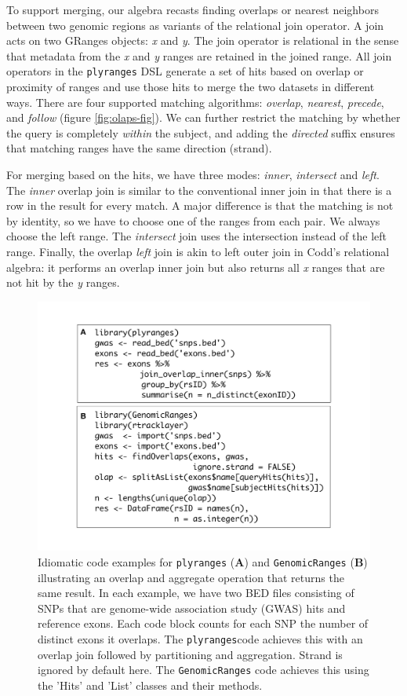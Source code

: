 \documentclass[]{article}
\begin{document}
To support merging, our algebra recasts finding overlaps or nearest
neighbors between two genomic regions as variants of the relational join
operator. A join acts on two GRanges objects: \emph{x} and \emph{y}. The
join operator is relational in the sense that metadata from the \emph{x}
and \emph{y} ranges are retained in the joined range. All join operators
in the \texttt{plyranges} DSL generate a set of hits based on overlap or
proximity of ranges and use those hits to merge the two datasets in
different ways. There are four supported matching algorithms:
\emph{overlap}, \emph{nearest}, \emph{precede}, and \emph{follow}
(figure \ref{fig:olaps-fig}). We can further restrict the matching by
whether the query is completely \emph{within} the subject, and adding
the \emph{directed} suffix ensures that matching ranges have the same
direction (strand).

For merging based on the hits, we have three modes: \emph{inner},
\emph{intersect} and \emph{left}. The \emph{inner} overlap join is
similar to the conventional inner join in that there is a row in the
result for every match. A major difference is that the matching is not
by identity, so we have to choose one of the ranges from each pair. We
always choose the left range. The \emph{intersect} join uses the
intersection instead of the left range. Finally, the overlap \emph{left}
join is akin to left outer join in Codd's relational algebra: it
performs an overlap inner join but also returns all \emph{x} ranges that
are not hit by the \emph{y} ranges.

\begin{figure}
\includegraphics[width=\textwidth]{diagrams/code-comparison.pdf}
\caption{Idiomatic code examples for \texttt{plyranges} (\textbf{A}) and 
\texttt{GenomicRanges} (\textbf{B}) illustrating an overlap and aggregate 
operation that returns the same result. 
In each example, we have two BED files consisting of SNPs that are
genome-wide association study (GWAS) hits and reference exons. Each code block
counts for each SNP the number of distinct exons it overlaps. The 
\texttt{plyranges}code achieves this with an overlap join followed by partitioning
and aggregation. Strand is ignored by default here. 
The \texttt{GenomicRanges} code achieves this using the 'Hits' and 'List' 
classes and their methods.}
\label{fig:code}
\end{figure}
\end{document}
